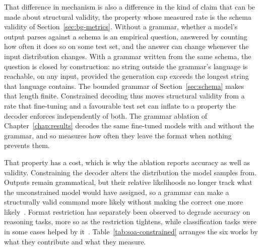 That difference in mechanism is also a difference in the kind of claim that can be made about
structural validity, the property whose measured rate is the schema validity of
Section~\ref{sec:bg-metrics}. Without a grammar, whether a model's output parses against a schema is an
empirical question, answered by counting how often it does so on some test set, and the answer
can change whenever the input distribution changes. With a grammar written from the same schema,
the question is closed by construction: no string outside the grammar's language is reachable, on
any input, provided the generation cap exceeds the longest string that language contains. The
bounded grammar of Section~\ref{sec:schema} makes that length finite. Constrained decoding thus
moves structural validity from a rate that fine-tuning and a favourable test set can inflate to a
property the decoder enforces independently of both. The grammar ablation of
Chapter~\ref{chap:results} decodes the same fine-tuned models with and without the grammar, and so
measures how often they leave the format when nothing prevents them.

That property has a cost, which is why the ablation reports accuracy as well as validity.
Constraining the decoder alters the distribution the model samples from. Outputs remain
grammatical, but their relative likelihoods no longer track what the unconstrained model would
have assigned, so a grammar can make a structurally valid command more likely without making the
correct one more likely~\cite{park2024}. Format restriction has separately been observed to
degrade accuracy on reasoning tasks, more so as the restriction tightens, while classification
tasks were in some cases helped by it~\cite{tam2024}. Table~\ref{tab:soa-constrained} arranges the
six works by what they contribute and what they measure.

